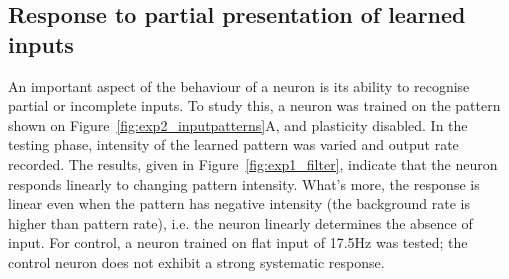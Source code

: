 \documentclass[a4paper,12pt]{report}
\theoremstyle{definition}
\begin{document}
\begin{figure}[!htb]
\begin{minipage}[t]{.5\textwidth}
  \captionsetup{width=0.95\linewidth}
  \label{fig:exp5_patterncompletion}
\end{minipage}
\end{figure}







\subsection{Response to partial presentation of learned inputs}
\label{subsec:partialpatterns}


An important aspect of the behaviour of a neuron is its ability to recognise partial or incomplete inputs. To study this, a neuron was trained on the pattern shown on Figure~\ref{fig:exp2_inputpatterns}A, and plasticity disabled. In the testing phase, intensity of the learned pattern was varied and output rate recorded. The results, given in Figure~\ref{fig:exp1_filter}, indicate that the neuron responds linearly to changing pattern intensity. What's more, the response is linear even when the pattern has negative intensity (the background rate is higher than pattern rate), i.e. the neuron linearly determines the absence of input. For control, a neuron trained on flat input of 17.5Hz was tested; the control neuron does not exhibit a strong systematic response.


\end{document}

